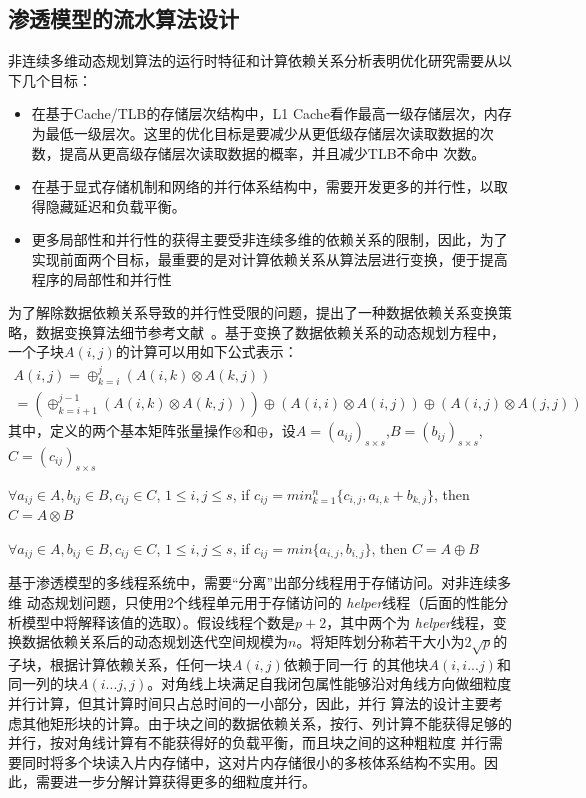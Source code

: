 \begin{flushleft}
\subsection{渗透模型的流水算法设计}
非连续多维动态规划算法的运行时特征和计算依赖关系分析表明优化研究需要从以下几个目标：
\begin{itemize}
	\item 在基于Cache/TLB的存储层次结构中，L1
	Cache看作最高一级存储层次，内存为最低一级层次。这里的优化目标是要减少从更低级存储层次读取数据的次数，提高从更高级存储层次读取数据的概率，并且减少TLB不命中
	次数。
	\item 在基于显式存储机制和网络的并行体系结构中，需要开发更多的并行性，以取得隐藏延迟和负载平衡。
	\item
	更多局部性和并行性的获得主要受非连续多维的依赖关系的限制，因此，为了实现前面两个目标，最重要的是对计算依赖关系从算法层进行变换，便于提高程序的局部性和并行性
\end{itemize}
为了解除数据依赖关系导致的并行性受限的问题，\citep{TanThesis2008}提出了一种数据依赖关系变换策略，数据变换算法细节参考文献~\citep{TanThesis2008,TanSC06}。基于变换了数据依赖关系的动态规划方程中，一个子块$A(i,j)$的计算可以用如下公式表示：
\begin{equation}
\label{eq:blocked_eq}
\begin{array}{l}
A(i, j)=\oplus_{k=i}^{j}(A(i,k)\otimes A(k,j))\\
=(\oplus_{k=i+1}^{j-1}(A(i,k)\otimes A(k,j)))\oplus(A(i,i)\otimes A(i,j))\oplus(A(i,j)\otimes A(j,j))
\end{array}
\end{equation}
其中，定义的两个基本矩阵张量操作$\otimes$和$\oplus$，设$A=(a_{ij})_{s\times s}$,$B=(b_{ij})_{s\times
	s}$,$C=(c_{ij})_{s\times s}$
\begin{definition}
	$\forall a_{ij}\in A, b_{ij}\in B, c_{ij}\in C$, $1\le i,j\le s$, if $c_{ij}=min_{k=1}^{n}\{c_{i,j},a_{i,k}+b_{k,j}\}$,
	then $C=A\otimes B$
\end{definition}
\begin{definition}
	$\forall a_{ij}\in A, b_{ij}\in B, c_{ij}\in C$, $1\le i,j\le s$, if $c_{ij}=min\{a_{i,j}, b_{i,j}\}$, then $C=A\oplus B$
\end{definition}

基于渗透模型的多线程系统中，需要“分离”出部分线程用于存储访问。对非连续多维
动态规划问题，只使用2个线程单元用于存储访问的{\em
	helper}线程（后面的性能分析模型中将解释该值的选取）。假设线程个数是$p+2$，其中两个为{\em
	helper}线程，变换数据依赖关系后的动态规划迭代空间规模为$n$。将矩阵划分称若干大小为$2\sqrt{p}$的子块，根据计算依赖关系，任何一块$A(i,j)$依赖于同一行
的其他块$A(i,i...j)$和同一列的块$A(i...j,j)$。对角线上块满足自我闭包属性能够沿对角线方向做细粒度并行计算，但其计算时间只占总时间的一小部分，因此，并行
算法的设计主要考虑其他矩形块的计算。由于块之间的数据依赖关系，按行、列计算不能获得足够的并行，按对角线计算有不能获得好的负载平衡，而且块之间的这种粗粒度
并行需要同时将多个块读入片内存储中，这对片内存储很小的多核体系结构不实用。因此，需要进一步分解计算获得更多的细粒度并行。


\end{flushleft}
